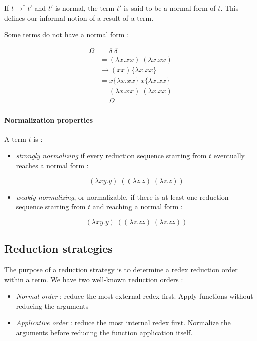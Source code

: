 \documentclass{article}
\theoremstyle{plain}
\theoremstyle{plain}
\begin{document}
  \vspace{0.5cm}

  If $t\to^* t'$ and $t'$ is normal, the term $t'$ is said to be a normal form
  of $t$. This defines our informal notion of a result of a term.

  Some terms do not have a normal form :

  \begin{align*}
    \Omega &= \delta\;\delta \\
          &= (\lambda x.xx)\; (\lambda x.xx) \\
          &\to (xx)\{\lambda x.xx\} \\
          &= x\{\lambda x.xx\}\;x\{\lambda x.xx\} \\
          &= (\lambda x.xx)\; (\lambda x.xx) \\
          &= \Omega
  \end{align*}

  \paragraph{Normalization properties} A term $t$ is :

  \begin{itemize}
    \item \textit{strongly normalizing} if every reduction sequence starting
      from $t$ eventually reaches a normal form :

      \[(\lambda xy.y)\;((\lambda z.z)\;(\lambda z.z))\]

    \item \textit{weakly normalizing}, or normalizable, if there is at least one
      reduction sequence starting from $t$ and reaching a normal form :

      \[(\lambda xy.y)\;((\lambda z.zz)\;(\lambda z.zz))\]
  \end{itemize}

  \subsection{Reduction strategies}

  The purpose of a reduction strategy is to determine a redex reduction order
  within a term. We have two well-known reduction orders :

  \begin{itemize}
    \item \textit{Normal order} : reduce the most external redex first. Apply
      functions without reducing the arguments
    \item \textit{Applicative order} : reduce the most internal redex first.
      Normalize the arguments before reducing the function application itself.
  \end{itemize}
\end{document}
